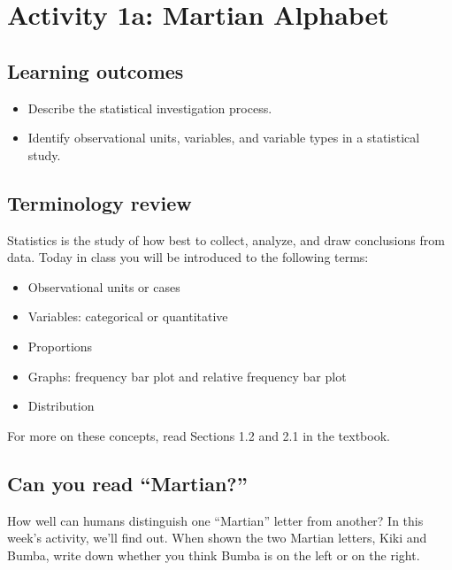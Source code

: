 \documentclass[
]{report}
\begin{document}
\newpage

\hypertarget{activity-1a-martian-alphabet}{%
\section{Activity 1a: Martian Alphabet}\label{activity-1a-martian-alphabet}}


\hypertarget{learning-outcomes}{%
\subsection{Learning outcomes}\label{learning-outcomes}}

\begin{itemize}
\item
  Describe the statistical investigation process.
\item
  Identify observational units, variables, and variable types in a statistical study.
\end{itemize}

\hypertarget{terminology-review}{%
\subsection{Terminology review}\label{terminology-review}}

Statistics is the study of how best to collect, analyze, and draw conclusions from data. Today in class you will be introduced to the following terms:

\begin{itemize}
\item
  Observational units or cases
\item
  Variables: categorical or quantitative
\item
  Proportions
\item
  Graphs: frequency bar plot and relative frequency bar plot
\item
  Distribution
\end{itemize}

For more on these concepts, read Sections 1.2 and 2.1 in the textbook.

\hypertarget{can-you-read-martian}{%
\subsection{Can you read ``Martian?''}\label{can-you-read-martian}}

How well can humans distinguish one ``Martian'' letter from another? In this week's activity, we'll find out. When shown the two Martian letters, Kiki and Bumba, write down whether you think Bumba is on the left or on the right.
\vspace{2mm}
\end{document}
